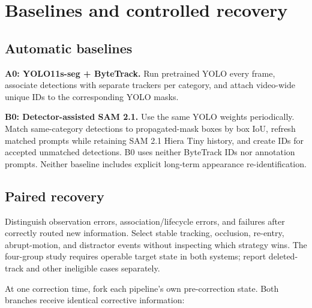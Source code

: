 \documentclass{article}
\begin{document}
\section{Baselines and controlled recovery}

\subsection{Automatic baselines}

\textbf{A0: YOLO11s-seg + ByteTrack.} Run pretrained YOLO every frame, associate detections with separate trackers per category, and attach video-wide unique IDs to the corresponding YOLO masks.

\textbf{B0: Detector-assisted SAM 2.1.} Use the same YOLO weights periodically. Match same-category detections to propagated-mask boxes by box IoU, refresh matched prompts while retaining SAM 2.1 Hiera Tiny history, and create IDs for accepted unmatched detections. B0 uses neither ByteTrack IDs nor annotation prompts. Neither baseline includes explicit long-term appearance re-identification.

\subsection{Paired recovery}

Distinguish observation errors, association/lifecycle errors, and failures after correctly routed new information. Select stable tracking, occlusion, re-entry, abrupt-motion, and distractor events without inspecting which strategy wins. The four-group study requires operable target state in both systems; report deleted-track and other ineligible cases separately.

At one correction time, fork each pipeline's own pre-correction state. Both branches receive identical corrective information:
\end{document}
